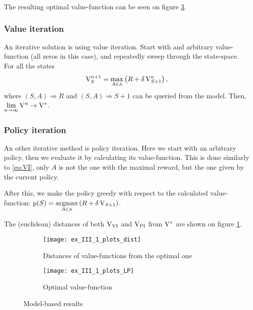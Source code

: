 The resulting optimal value-function can be seen on figure \ref{fig:LP}.

\subsubsection{Value iteration}

An iterative solution is using value iteration.
Start with and arbitrary value-function (all zeros in this case),
and repeatedly sweep through the state-space. For all the states
\begin{equation}\label{eq:VI}
	\mathrm{V}_S^{n+1} = \max\limits_{A\in\mathbb{A}}\left(R + \delta\,\mathrm{V}_{S+1}^n\right),
\end{equation}
where $(S,A)\Rightarrow R$ and $(S,A)\Rightarrow S+1$
can be queried from the model.
Then, $\lim\limits_{n\rightarrow\infty}\mathrm{V}^n\rightarrow\mathrm{V}^*$.

\subsubsection{Policy iteration}\label{sssec:PI}

An other iterative method is policy iteration.
Here we start with an arbitrary policy, then we evaluate it by calculating its value-function.
This is done similarly to \ref{eq:VI}, only $A$ is not the one with the maximal reward,
but the one given by the current policy.

After this, we make the policy greedy with respect to the calculated value-function:
$\mathrm{p}(S)=\underset{A\in\mathbb{A}}{\operatorname{argmax}}\left(R + \delta\,\mathrm{V}_{S+1}\right)$.

The (euclidean) distances of both $\mathrm{V}_\text{VI}$ and $\mathrm{V}_\text{PI}$ from $\mathrm{V}^*$ are
shown on figure \ref{fig:dist-1}.

\begin{figure}[H]
	\centering
	\begin{subfigure}{.45\textwidth}
		\centering
		\texttt{[image: ex\_III\_1\_plots\_dist]}
		\caption{Distances of value-functions from the optimal one}
		\label{fig:dist-1}
	\end{subfigure}
	\begin{subfigure}{.45\textwidth}
		\centering
		\texttt{[image: ex\_III\_1\_plots\_LP]}
		\caption{Optimal value-function}
		\label{fig:LP}
	\end{subfigure}
	\caption{Model-based results}
\end{figure}

